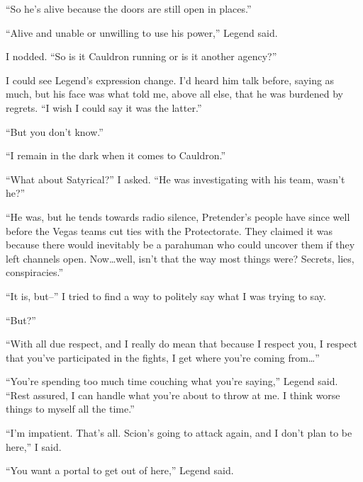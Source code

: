 ``So he's alive because the doors are still open in places.''



``Alive and unable or unwilling to use his power,'' Legend said.



I nodded.  ``So is it Cauldron running or is it another agency?''



I could see Legend's expression change.  I'd heard him talk before, saying as much, but his face was what told me, above all else, that he was burdened by regrets.  ``I wish I could say it was the latter.''



``But you don't know.''



``I remain in the dark when it comes to Cauldron.''



``What about Satyrical?'' I asked.  ``He was investigating with his team, wasn't he?''



``He was, but he tends towards radio silence, Pretender's people have since well before the Vegas teams cut ties with the Protectorate.  They claimed it was because there would inevitably be a parahuman who could uncover them if they left channels open.  Now\ldots well, isn't that the way most things were?  Secrets, lies, conspiracies.''



``It is, but--'' I tried to find a way to politely say what I was trying to say.



``But?''



``With all due respect, and I really do mean that because I respect you, I respect that you've participated in the fights, I get where you're coming from\ldots''



``You're spending too much time couching what you're saying,'' Legend said.  ``Rest assured, I can handle what you're about to throw at me.  I think worse things to myself all the time.''



``I'm impatient.  That's all.  Scion's going to attack again, and I don't plan to be here,'' I said.



``You want a portal to get out of here,'' Legend said.



